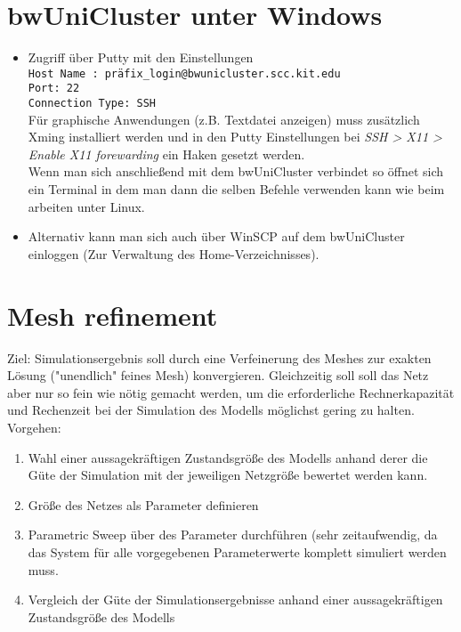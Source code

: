 \documentclass[12pt]{scrartcl}%
\theoremstyle{nonumberplain}
\begin{document}
\section{bwUniCluster unter Windows}
\begin{itemize}
\item Zugriff über Putty mit den Einstellungen\\
\hspace*{0.5cm}\texttt{Host Name : präfix\_login@bwunicluster.scc.kit.edu}\\
\hspace*{0.5cm}\texttt{Port: 22}\\ 
\hspace*{0.5cm}\texttt{Connection Type: SSH} \\ 
Für graphische Anwendungen (z.B. Textdatei anzeigen) muss zusätzlich Xming installiert werden und in den Putty Einstellungen bei \textit{SSH > X11 > Enable X11 forewarding} ein Haken gesetzt werden.\\
Wenn man sich anschließend mit dem bwUniCluster verbindet so öffnet sich ein Terminal in dem man dann die selben Befehle verwenden kann wie beim arbeiten unter Linux.
\item Alternativ kann man sich auch über WinSCP auf dem bwUniCluster einloggen (Zur Verwaltung des Home-Verzeichnisses).
\end{itemize}

\section{Mesh refinement}
Ziel: Simulationsergebnis soll durch eine Verfeinerung des Meshes zur exakten Lösung ("unendlich" feines Mesh) konvergieren. Gleichzeitig soll soll das Netz aber nur so fein wie nötig gemacht werden, um die erforderliche Rechnerkapazität und Rechenzeit bei der Simulation des Modells möglichst gering zu halten. \\
Vorgehen:
\begin{enumerate}
\item Wahl einer aussagekräftigen Zustandsgröße des Modells anhand derer die Güte der Simulation mit der jeweiligen Netzgröße bewertet werden kann.
\item Größe des Netzes als Parameter definieren
\item Parametric Sweep über des Parameter durchführen (sehr zeitaufwendig, da das System für alle vorgegebenen Parameterwerte komplett simuliert werden muss.
\item Vergleich der Güte der Simulationsergebnisse anhand einer aussagekräftigen Zustandsgröße
des Modells 
\end{enumerate} 
\end{document}
